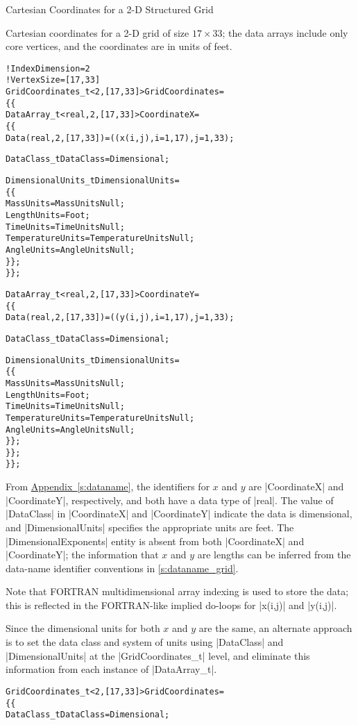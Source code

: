 \begin{example}{Cartesian Coordinates for a 2-D Structured Grid}
\label{ex:grid1}

Cartesian coordinates for a 2-D grid of size $17\times33$; the data
arrays include only core vertices, and the coordinates are in units of feet.
\begin{alltt}
  !  IndexDimension = 2
  !  VertexSize = [17,33]
  GridCoordinates\_t<2, [17,33]> GridCoordinates =
    \{\{
    DataArray\_t<real, 2, [17,33]> CoordinateX =
      \{\{
      Data(real, 2, [17,33]) = ((x(i,j), i=1,17), j=1,33) ;

      DataClass\_t DataClass = Dimensional ;
      
      DimensionalUnits\_t DimensionalUnits = 
        \{\{ 
        MassUnits        = MassUnitsNull ;
        LengthUnits      = Foot ;
        TimeUnits        = TimeUnitsNull ;
        TemperatureUnits = TemperatureUnitsNull ;
        AngleUnits       = AngleUnitsNull ;
        \}\} ;
      \}\} ;

    DataArray\_t<real, 2, [17,33]> CoordinateY =
      \{\{
      Data(real, 2, [17,33]) = ((y(i,j), i=1,17), j=1,33) ;

      DataClass\_t DataClass = Dimensional ;
      
      DimensionalUnits\_t DimensionalUnits = 
        \{\{ 
        MassUnits        = MassUnitsNull ;
        LengthUnits      = Foot ;
        TimeUnits        = TimeUnitsNull ;
        TemperatureUnits = TemperatureUnitsNull ;
        AngleUnits       = AngleUnitsNull ;
        \}\} ;
      \}\} ;
    \}\} ;
\end{alltt}
From \hyperref[s:dataname]{Appendix~\ref*{s:dataname}}, the identifiers
for $x$ and $y$ are |CoordinateX| and |CoordinateY|, respectively, and
both have a data type of |real|.
The value of |DataClass| in |CoordinateX| and |CoordinateY| indicate
the data is dimensional, and |DimensionalUnits| specifies the appropriate
units are feet.
The |DimensionalExponents| entity is absent from both |CoordinateX| and
|CoordinateY|; the information that $x$ and $y$ are lengths can be
inferred from the data-name identifier conventions in
\autoref{s:dataname_grid}.

Note that FORTRAN multidimensional array indexing is used to store
the data; this is reflected in the FORTRAN-like implied do-loops for
|x(i,j)| and |y(i,j)|.

Since the dimensional units for both $x$ and $y$ are the same, an
alternate approach is to set the data class and system of units using
|DataClass| and |DimensionalUnits| at the |GridCoordinates_t| level, and
eliminate this information from each instance of |DataArray_t|.
\begin{alltt}
  GridCoordinates\_t<2, [17,33]> GridCoordinates =
    \{\{
    DataClass\_t DataClass = Dimensional ;
    

\end{alltt}
\end{example}
